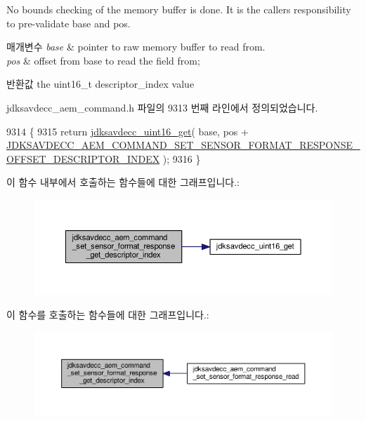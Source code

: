 No bounds checking of the memory buffer is done. It is the caller\textquotesingle{}s responsibility to pre-\/validate base and pos.


\begin{DoxyParams}{매개변수}
{\em base} & pointer to raw memory buffer to read from. \\
\hline
{\em pos} & offset from base to read the field from; \\
\hline
\end{DoxyParams}
\begin{DoxyReturn}{반환값}
the uint16\+\_\+t descriptor\+\_\+index value 
\end{DoxyReturn}


jdksavdecc\+\_\+aem\+\_\+command.\+h 파일의 9313 번째 라인에서 정의되었습니다.


\begin{DoxyCode}
9314 \{
9315     \textcolor{keywordflow}{return} \hyperlink{group__endian_ga3fbbbc20be954aa61e039872965b0dc9}{jdksavdecc\_uint16\_get}( base, pos + 
      \hyperlink{group__command__set__sensor__format__response_ga3347921260949eb8cb16598c979b5ee0}{JDKSAVDECC\_AEM\_COMMAND\_SET\_SENSOR\_FORMAT\_RESPONSE\_OFFSET\_DESCRIPTOR\_INDEX}
       );
9316 \}
\end{DoxyCode}


이 함수 내부에서 호출하는 함수들에 대한 그래프입니다.\+:
\nopagebreak
\begin{figure}[H]
\begin{center}
\leavevmode
\includegraphics[width=350pt]{group__command__set__sensor__format__response_ga404aefce22547a271cb35bf68dc91a01_cgraph}
\end{center}
\end{figure}




이 함수를 호출하는 함수들에 대한 그래프입니다.\+:
\nopagebreak
\begin{figure}[H]
\begin{center}
\leavevmode
\includegraphics[width=350pt]{group__command__set__sensor__format__response_ga404aefce22547a271cb35bf68dc91a01_icgraph}
\end{center}
\end{figure}


